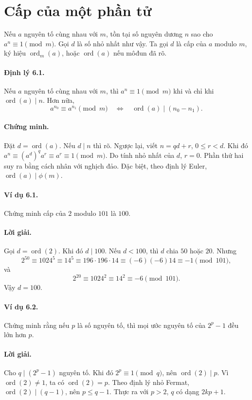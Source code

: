\documentclass[11pt]{article}
\DeclareMathOperator{\ord}{ord}
\begin{document}
\section{Cấp của một phần tử}

Nếu \(a\) nguyên tố cùng nhau với \(m\), tồn tại số nguyên dương \(n\) sao cho
\(a^n\equiv1\pmod m\). Gọi \(d\) là số nhỏ nhất như vậy. Ta gọi \(d\) là cấp
của \(a\) modulo \(m\), ký hiệu \(\ord_m(a)\), hoặc \(\ord(a)\) nếu môđun đã
rõ.

\paragraph{Định lý 6.1.}
Nếu \(a\) nguyên tố cùng nhau với \(m\), thì \(a^n\equiv1\pmod m\) khi và chỉ
khi \(\ord(a)\mid n\). Hơn nữa,
\[
 a^{n_0}\equiv a^{n_1}\pmod m
 \quad\Longleftrightarrow\quad
 \ord(a)\mid(n_0-n_1).
\]

\paragraph{Chứng minh.}
Đặt \(d=\ord(a)\). Nếu \(d\mid n\) thì rõ. Ngược lại, viết \(n=qd+r\),
\(0\le r<d\). Khi đó \(a^n\equiv(a^d)^qa^r\equiv a^r\equiv1\pmod m\). Do tính
nhỏ nhất của \(d\), \(r=0\). Phần thứ hai suy ra bằng cách nhân với nghịch đảo.
Đặc biệt, theo định lý Euler, \(\ord(a)\mid\phi(m)\).

\paragraph{Ví dụ 6.1.}
Chứng minh cấp của \(2\) modulo \(101\) là \(100\).

\paragraph{Lời giải.}
Gọi \(d=\ord(2)\). Khi đó \(d\mid100\). Nếu \(d<100\), thì \(d\) chia \(50\)
hoặc \(20\). Nhưng
\[
 2^{50}\equiv1024^5\equiv14^5\equiv196\cdot196\cdot14
\equiv(-6)(-6)14\equiv-1\pmod{101},
\]
và
\[
 2^{20}\equiv1024^2\equiv14^2\equiv-6\pmod{101}.
\]
Vậy \(d=100\).

\paragraph{Ví dụ 6.2.}
Chứng minh rằng nếu \(p\) là số nguyên tố, thì mọi ước nguyên tố của \(2^p-1\)
đều lớn hơn \(p\).

\paragraph{Lời giải.}
Cho \(q\mid(2^p-1)\) nguyên tố. Khi đó \(2^p\equiv1\pmod q\), nên
\(\ord(2)\mid p\). Vì \(\ord(2)\ne1\), ta có \(\ord(2)=p\). Theo định lý nhỏ
Fermat, \(\ord(2)\mid(q-1)\), nên \(p\le q-1\). Thực ra với \(p>2\), \(q\) có
dạng \(2kp+1\).
\end{document}
